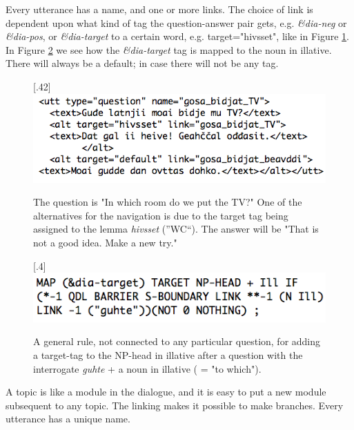 \documentclass[11pt]{article}
\begin{document}
Every utterance has a name, and one or more links. The choice of link is dependent upon what kind of tag the question-answer pair gets, e.g. \textit{\&dia-neg} or \textit{\&dia-pos}, or \textit{\&dia-target} to a certain word, e.g. target="hivsset", like in Figure \ref{TV}.  In Figure \ref{targetIll} we see how the \textit{\&dia-target} tag is mapped to the noun in illative. There will always be a default; in case there will not be any tag. \\

\begin{figure}[htbp]
\begin{center}
\scalebox{.40}[.42]{\includegraphics{presentation/img/gosabidjatTV2.png}}
\caption{The question is "In which room do we put the TV?" One of the alternatives for the navigation is due to the target tag being assigned to the lemma \textit{hivsset} (''WC``). The answer will be "That is not a good idea. Make a new try."}
\label{TV}
\end{center}
\end{figure}


\begin{figure}[htbp]
\begin{center}
\scalebox{.4}[.4]{\includegraphics{presentation/img/targetIll2.png}}
\caption{A general rule, not connected to any particular question, for adding a target-tag to the NP-head in illative after a question with the interrogate \textit{guhte} + a noun in illative ( = "to which").}
\label{targetIll}
\end{center}
\end{figure}

A topic is like a module in the dialogue, and it is easy to put a new module subsequent to any topic. The linking makes it possible to make branches. Every utterance has a unique name.  
\end{document}
